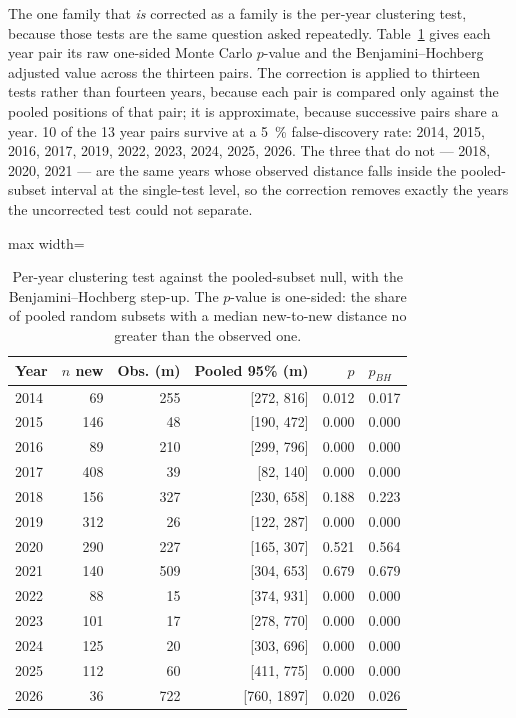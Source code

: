 \documentclass[fleqn,10pt]{wlpeerj}
\begin{document}
The one family that \emph{is} corrected as a family is the per-year clustering test, because
those tests are the same question asked repeatedly. Table~\ref{si:bh} gives each year pair its
raw one-sided Monte Carlo $p$-value and the Benjamini--Hochberg adjusted value across the
thirteen pairs. The correction is applied to thirteen tests rather than fourteen years, because
each pair is compared only against the pooled positions of that pair; it is approximate, because
successive pairs share a year. 10 of the 13 year pairs survive at a \SI{5}{\percent} false-discovery rate: 2014, 2015, 2016, 2017, 2019, 2022, 2023, 2024, 2025, 2026. The three that do not --- 2018, 2020, 2021 --- are the same years whose observed distance falls inside the pooled-subset interval at the single-test level, so the correction removes exactly the years the uncorrected test could not separate.

\begin{table}[H]
\centering
\caption{Per-year clustering test against the pooled-subset null, with the Benjamini--Hochberg step-up. The $p$-value is one-sided: the share of pooled random subsets with a median new-to-new distance no greater than the observed one.}
\label{si:bh}
\small
\begin{adjustbox}{max width=\linewidth}
\begin{tabular}{lrrrrl}
\toprule
Year & $n$ new & Obs. (m) & Pooled 95\% (m) & $p$ & $p_{BH}$ \\
\midrule
2014 & 69 & 255 & [272, 816] & 0.012 & 0.017 \\
2015 & 146 & 48 & [190, 472] & 0.000 & 0.000 \\
2016 & 89 & 210 & [299, 796] & 0.000 & 0.000 \\
2017 & 408 & 39 & [82, 140] & 0.000 & 0.000 \\
2018 & 156 & 327 & [230, 658] & 0.188 & 0.223 \\
2019 & 312 & 26 & [122, 287] & 0.000 & 0.000 \\
2020 & 290 & 227 & [165, 307] & 0.521 & 0.564 \\
2021 & 140 & 509 & [304, 653] & 0.679 & 0.679 \\
2022 & 88 & 15 & [374, 931] & 0.000 & 0.000 \\
2023 & 101 & 17 & [278, 770] & 0.000 & 0.000 \\
2024 & 125 & 20 & [303, 696] & 0.000 & 0.000 \\
2025 & 112 & 60 & [411, 775] & 0.000 & 0.000 \\
2026 & 36 & 722 & [760, 1897] & 0.020 & 0.026 \\
\bottomrule
\end{tabular}
\end{adjustbox}
\end{table}
\end{document}
